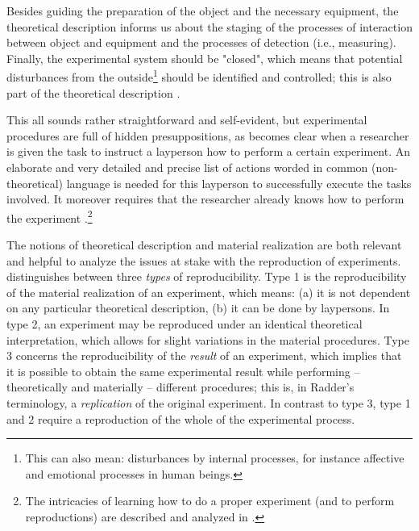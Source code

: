 \documentclass[twocolumn, serif, authordate, reflection]{jote-article}
\begin{document}
Besides guiding the preparation of the object and the necessary equipment, the theoretical description informs us about the staging of the processes of interaction between object and equipment and the processes of detection (i.e., measuring). Finally, the experimental system should be "closed", which means that potential disturbances from the outside\footnote{ This can also mean: disturbances by internal processes, for instance affective and emotional processes in human beings. } should be identified and controlled; this is also part of the theoretical description \parencite{Radder1996}. 

This all sounds rather straightforward and self-evident, but experimental procedures are full of hidden presuppositions, as becomes clear when a researcher is given the task to instruct a layperson how to perform a certain experiment. An elaborate and very detailed and precise list of actions worded in common (non-theoretical) language is needed for this layperson to successfully execute the tasks involved. It moreover requires that the researcher already knows how to perform the experiment \parencite{Collins1985}.\footnote{The intricacies of learning how to do a proper experiment (and to perform reproductions) are described and analyzed in \textcite{Collins1985}.}

The notions of theoretical description and material realization are both relevant and helpful to analyze the issues at stake with the reproduction of experiments. \textcite{Radder1996} distinguishes between three \textit{types} of reproducibility. Type 1 is the reproducibility of the material realization of an experiment, which means: (a) it is not dependent on any particular theoretical description, (b) it can be done by laypersons. In type 2, an experiment may be reproduced under an identical theoretical interpretation, which allows for slight variations in the material procedures. Type 3 concerns the reproducibility of the \textit{result} of an experiment, which implies that it is possible to obtain the same experimental result while performing – theoretically and materially – different procedures; this is, in Radder’s terminology, a \textit{replication }of the original experiment. In contrast to type 3, type 1 and 2 require a reproduction of the whole of the experimental process. 
\end{document}
